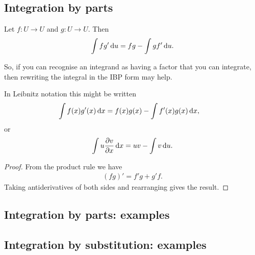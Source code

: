 \subsection{Integration by parts}


\begin{theorem}
  Let $f:U \to U$ and $g:U \to U$. Then
  \begin{align*}
    \int fg' \du = fg - \int gf' \du.
  \end{align*}
\end{theorem}


So, if you can recognise an integrand as having a factor that you can integrate, then rewriting the
integral in the IBP form may help.

In Leibnitz notation this might be written
\begin{align*}
    \int f(x)g'(x) \dx &= f(x)g(x) - \int f'(x)g(x) \dx,
\end{align*}
or
\begin{align*}
  \int u \dvdx \dx = uv - \int v \du.
\end{align*}


\begin{proof}
  From the product rule we have
  \begin{align*}
    (fg)' = f'g + g'f.
  \end{align*}
  Taking antiderivatives of both sides and rearranging gives the result.
\end{proof}

\subsection{Integration by parts: examples}


\subsection{Integration by substitution: examples}


